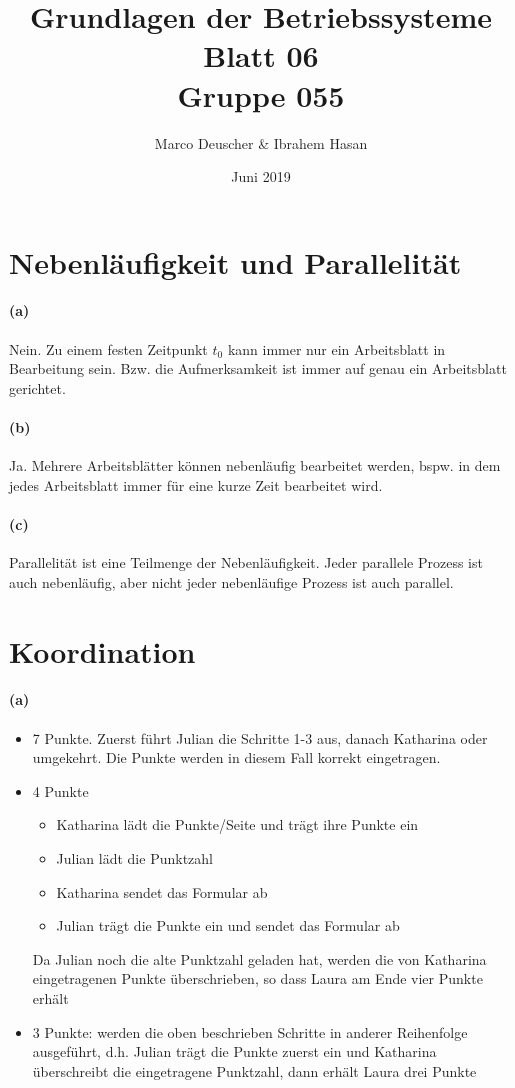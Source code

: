 \documentclass[a4paper]{article}
\title{Grundlagen der Betriebssysteme\\ Blatt 06 \\ Gruppe 055}
\author{Marco Deuscher & Ibrahem Hasan}
\date{Juni 2019}
\begin{document}
\maketitle
\section{Nebenläufigkeit und Parallelität}
\paragraph{(a)}
Nein. Zu einem festen Zeitpunkt $t_0$ kann immer nur ein Arbeitsblatt in Bearbeitung sein. Bzw. die Aufmerksamkeit ist immer auf genau ein Arbeitsblatt gerichtet.

\paragraph{(b)}
Ja. Mehrere Arbeitsblätter können nebenläufig bearbeitet werden, bspw. in dem jedes Arbeitsblatt immer für eine kurze Zeit bearbeitet wird.

\paragraph{(c)}
Parallelität ist eine Teilmenge der Nebenläufigkeit. Jeder parallele Prozess ist auch nebenläufig, aber nicht jeder nebenläufige Prozess ist auch parallel.

\section{Koordination}
\paragraph{(a)}
\begin{itemize}
    \item 7 Punkte. Zuerst führt Julian die Schritte 1-3 aus, danach Katharina oder umgekehrt. Die Punkte werden in diesem Fall korrekt eingetragen.
    \item 4 Punkte \begin{itemize}
        \item Katharina lädt die Punkte/Seite und trägt ihre Punkte ein
        \item Julian lädt die Punktzahl
        \item Katharina sendet das Formular ab
        \item Julian trägt die Punkte ein und sendet das Formular ab
    \end{itemize}
    Da Julian noch die alte Punktzahl geladen hat, werden die von Katharina eingetragenen Punkte überschrieben, so dass Laura am Ende vier Punkte erhält
    \item 3 Punkte: werden die oben beschrieben Schritte in anderer Reihenfolge ausgeführt, d.h. Julian trägt die Punkte zuerst ein und Katharina überschreibt die eingetragene Punktzahl, dann erhält Laura drei Punkte
\end{itemize}
\end{document}
